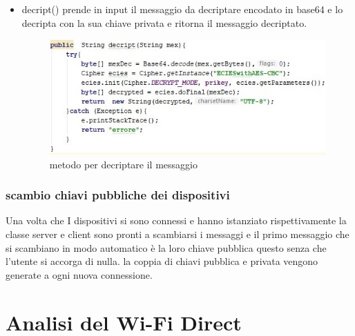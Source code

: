 \begin{itemize}
   \item decript() prende in input il messaggio da decriptare encodato in base64
   e lo decripta con
   la sua chiave privata e ritorna il messaggio decriptato.
   \begin{figure}
       \caption{metodo per decriptare il messaggio}
       \includegraphics[width=1  \columnwidth]{imgs/decript.jpg}
   \end{figure}



\end{itemize}

\subsubsection{scambio chiavi pubbliche dei dispositivi}
Una volta che I dispositivi si sono connessi e hanno istanziato
rispettivamente la classe server e client sono pronti a scambiarsi i messaggi
e il primo messaggio che si scambiano in modo automatico è la loro chiave pubblica
questo senza che l'utente si accorga di nulla.
la coppia di chiavi pubblica e privata vengono generate a ogni nuova connessione.


\section{Analisi del Wi-Fi Direct}

